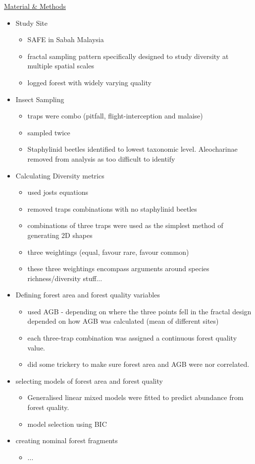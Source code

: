 \underline{Material \& Methods}
\begin{itemize}
	\item Study Site
	\begin{itemize}
		\item SAFE in Sabah Malaysia
		\item fractal sampling pattern specifically designed to study diversity at multiple spatial scales
		\item logged forest with widely varying quality
	\end{itemize}
	\item Insect Sampling
	\begin{itemize}
		\item traps were combo (pitfall, flight-interception and malaise)
		\item sampled twice
		\item Staphylinid beetles identified to lowest taxonomic level. Aleocharinae removed from analysis as too difficult to identify
	\end{itemize}
	\item Calculating Diversity metrics
	\begin{itemize}
		\item used josts equations
		\item removed traps combinations with no staphylinid beetles
		\item combinations of three traps were used as the simplest method of generating 2D shapes
		\item three weightings (equal, favour rare, favour common)
		\item these three weightings encompass arguments around species richness/diversity stuff...
	\end{itemize}
	\item Defining forest area and forest quality variables
	\begin{itemize}
		\item used AGB - depending on where the three points fell in the fractal design depended on how AGB was calculated (mean of different sites)
		\item each three-trap combination was assigned a continuous forest quality value.
		\item did some trickery to make sure forest area and AGB were nor correlated.
	\end{itemize}
	\item selecting models of forest area and forest quality
	\begin{itemize}
		\item Generalised linear mixed models were fitted to predict abundance from forest quality.
		\item model selection using BIC
	\end{itemize}
	\item creating nominal forest fragments
	\begin{itemize}
		\item ...
	\end{itemize}
\end{itemize}


